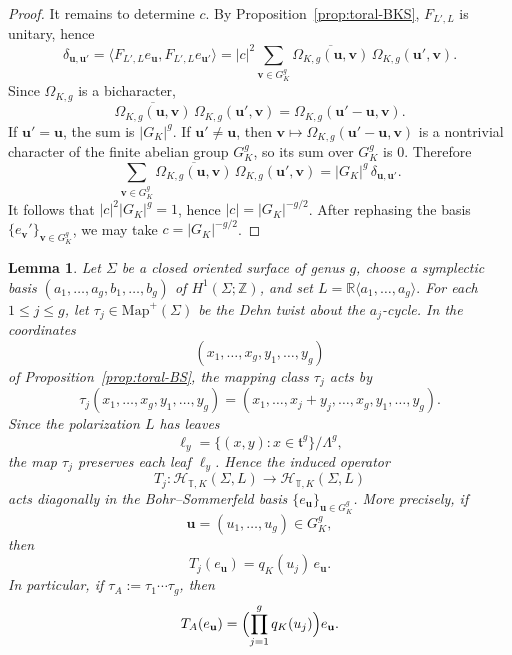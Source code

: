 \documentclass[12pt]{amsart}
\numberwithin{equation}{section}
\newtheorem{lemma}[theorem]{Lemma}
\begin{document}
\begin{proof}
It remains to determine $c$. By Proposition~\ref{prop:toral-BKS}, $F_{L',L}$ is unitary,
hence
\[
\delta_{\mathbf u,\mathbf u'}
=
\langle F_{L',L}e_{\mathbf u},F_{L',L}e_{\mathbf u'}\rangle
=
|c|^2\sum_{\mathbf v\in G_K^g}
\overline{\Omega_{K,g}(\mathbf u,\mathbf v)}\,\Omega_{K,g}(\mathbf u',\mathbf v).
\]
Since $\Omega_{K,g}$ is a bicharacter,
\[
\overline{\Omega_{K,g}(\mathbf u,\mathbf v)}\,\Omega_{K,g}(\mathbf u',\mathbf v)
=
\Omega_{K,g}(\mathbf u'-\mathbf u,\mathbf v).
\]
If $\mathbf u'=\mathbf u$, the sum is $|G_K|^g$. If $\mathbf u'\neq \mathbf u$, then
$\mathbf v\mapsto \Omega_{K,g}(\mathbf u'-\mathbf u,\mathbf v)$ is a nontrivial character
of the finite abelian group $G_K^g$, so its sum over $G_K^g$ is $0$. Therefore
\[
\sum_{\mathbf v\in G_K^g}
\overline{\Omega_{K,g}(\mathbf u,\mathbf v)}\,\Omega_{K,g}(\mathbf u',\mathbf v)
=
|G_K|^g\,\delta_{\mathbf u,\mathbf u'}.
\]
It follows that $|c|^2|G_K|^g=1$, hence $|c|=|G_K|^{-g/2}$. After rephasing the basis
$\{e_{\mathbf v}'\}_{\mathbf v\in G_K^g}$, we may take $c=|G_K|^{-g/2}$.
\end{proof}

\begin{lemma}\label{lem:genus-T-diagonal}
Let $\Sigma$ be a closed oriented surface of genus $g$, choose a symplectic basis $(a_1,\dots,a_g,b_1,\dots,b_g)$ of $H^1(\Sigma;\mathbb Z)$, and set $L=\mathbb R\langle a_1,\dots,a_g\rangle.$ For each $1\le j\le g$, let $\tau_j\in \mathrm{Map}^+(\Sigma)$ be the Dehn twist about the
$a_j$-cycle. In the coordinates
\[
(x_1,\dots,x_g,y_1,\dots,y_g)
\]
of Proposition~\ref{prop:toral-BS}, the mapping class $\tau_j$ acts by
\[
\tau_j(x_1,\dots,x_g,y_1,\dots,y_g)
=
(x_1,\dots,x_j+y_j,\dots,x_g,y_1,\dots,y_g).
\]
Since the polarization $L$ has leaves
\[
\ell_y=\{(x,y):x\in \mathfrak  t^g\}/\Lambda^g,
\]
the map $\tau_j$ preserves each leaf $\ell_y$. Hence the induced operator
\[
T_j:\mathcal H_{\mathbb T,K}(\Sigma,L)\to \mathcal H_{\mathbb T,K}(\Sigma,L)
\]
acts diagonally in the Bohr--Sommerfeld basis
$\{e_{\mathbf u}\}_{\mathbf u\in G_K^g}$. More precisely, if
\[
\mathbf u=(u_1,\dots,u_g)\in G_K^g,
\]
then
\[
T_j(e_{\mathbf u})=q_K(u_j)\,e_{\mathbf u}.
\]
In particular, if $\tau_A:=\tau_1\cdots \tau_g$, then
\[
T_A(e_{\mathbf u})
=
\Bigl(\prod_{j=1}^g q_K(u_j)\Bigr)e_{\mathbf u}.
\]
\end{lemma}
\end{document}

